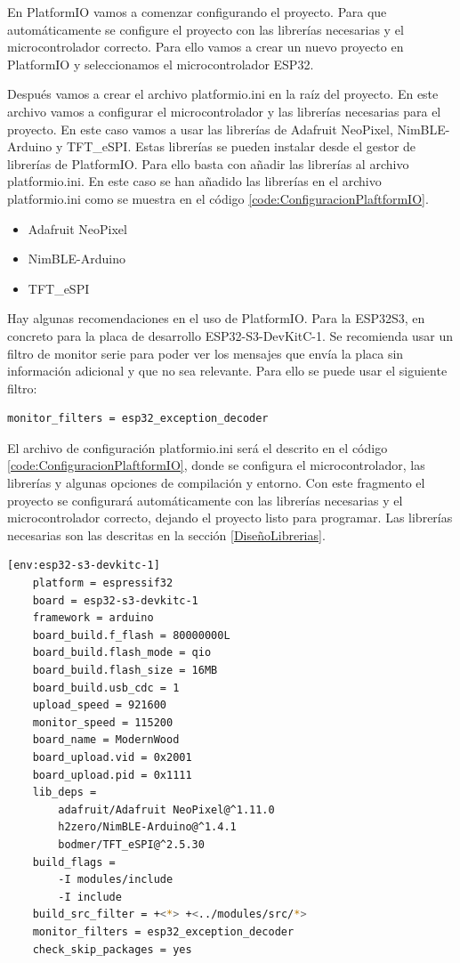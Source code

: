 En \gls{PlatformIO} vamos a comenzar configurando el proyecto. Para que automáticamente se configure el proyecto con las librerías necesarias y el microcontrolador correcto. Para ello vamos a crear un nuevo proyecto en \gls{PlatformIO} y seleccionamos el microcontrolador ESP32.

Después vamos a crear el archivo platformio.ini en la raíz del proyecto. En este archivo vamos a configurar el microcontrolador y las librerías necesarias para el proyecto. En este caso vamos a usar las librerías de Adafruit NeoPixel, NimBLE-Arduino y TFT\_eSPI. Estas librerías se pueden instalar desde el gestor de librerías de \gls{PlatformIO}. Para ello basta con añadir las librerías al archivo platformio.ini. En este caso se han añadido las librerías en el archivo platformio.ini como se muestra en el código \ref{code:ConfiguracionPlaftformIO}.

\begin{itemize}
\item Adafruit NeoPixel
\item NimBLE-Arduino
\item TFT\_eSPI
\end{itemize}
\label{LibreriasPlatformIO}

Hay algunas recomendaciones en el uso de \gls{PlatformIO}. Para la ESP32S3, en concreto para la placa de desarrollo ESP32-S3-DevKitC-1. Se recomienda usar un filtro de monitor serie para poder ver los mensajes que envía la placa sin información adicional y que no sea relevante. Para ello se puede usar el siguiente filtro:

\begin{lstlisting}[style=console, language=bash, caption={Filtro recomendado de \gls{PlatformIO}}, label={code:FiltroEspecial}]
monitor_filters = esp32_exception_decoder
\end{lstlisting}
\newpage
El archivo de configuración platformio.ini será el descrito en el código \ref{code:ConfiguracionPlaftformIO}, donde se configura el microcontrolador, las librerías y algunas opciones de compilación y entorno. Con este fragmento el proyecto se configurará automáticamente con las librerías necesarias y el microcontrolador correcto, dejando el proyecto listo para programar. Las librerías necesarias son las descritas en la sección \ref{DiseñoLibrerias}.

\begin{lstlisting}[style=console, language=bash, caption={Configuracion \gls{PlatformIO}}, label={code:ConfiguracionPlaftformIO}]
    [env:esp32-s3-devkitc-1]
    platform = espressif32
    board = esp32-s3-devkitc-1
    framework = arduino
    board_build.f_flash = 80000000L
    board_build.flash_mode = qio
    board_build.flash_size = 16MB
    board_build.usb_cdc = 1
    upload_speed = 921600
    monitor_speed = 115200
    board_name = ModernWood
    board_upload.vid = 0x2001
    board_upload.pid = 0x1111
    lib_deps = 
        adafruit/Adafruit NeoPixel@^1.11.0
        h2zero/NimBLE-Arduino@^1.4.1
        bodmer/TFT_eSPI@^2.5.30
    build_flags =
        -I modules/include
        -I include
    build_src_filter = +<*> +<../modules/src/*>
    monitor_filters = esp32_exception_decoder
    check_skip_packages = yes
\end{lstlisting}

